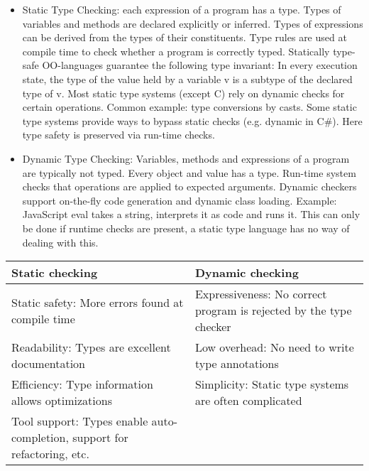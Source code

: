 \begin{mytitle} \hfill
\begin{itemize}
    \item Static Type Checking: each expression of a program has a type. Types of variables and methods are declared explicitly or inferred. Types of expressions can be derived from the types of their constituents. Type rules are used at compile time to check whether a program is correctly typed. Statically type-safe OO-languages guarantee the following type invariant: In every execution state, the type of the value held by a variable v is a subtype of the declared type of v. Most static type systems (except C) rely on dynamic checks for certain operations. Common example: type conversions by casts. Some static type systems provide ways to bypass static checks (e.g. dynamic in C\#). Here type safety is preserved via run-time checks.
    \item Dynamic Type Checking: Variables, methods and expressions of a program are typically not typed. Every object and value has a type. Run-time system checks that operations are applied to expected arguments. Dynamic checkers support on-the-fly code generation and dynamic class loading. Example: JavaScript eval takes a string, interprets it as code and runs it. This can only be done if runtime checks are present, a static type language has no way of dealing with this.
\end{itemize}
\begin{center}
    \begin{tabular}{R{0.4\textwidth}| L{0.4\textwidth}}
        \textbf{Static checking} & \textbf{Dynamic checking} \\
        \hline
        Static safety: More errors found at compile time & Expressiveness: No correct program is rejected by the type checker\\
        Readability: Types are excellent documentation & Low overhead: No need to write type annotations\\
        Efficiency: Type information allows optimizations & Simplicity: Static type systems are often complicated\\
        Tool support: Types enable auto-completion, support for refactoring, etc. & 
    \end{tabular}
\end{center}
\end{mytitle}
